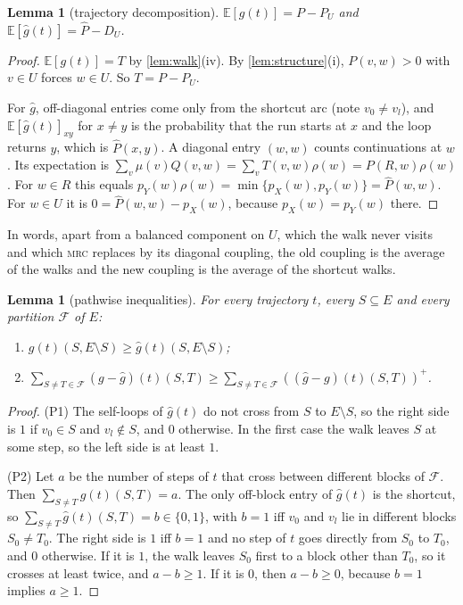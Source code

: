 \documentclass[11pt]{article}
\newtheorem{lemma}[theorem]{Lemma}
\theoremstyle{definition}
\newcommand{\pX}{p_X}
\newcommand{\pY}{p_Y}
\newcommand{\hP}{\hat P}
\newcommand{\pos}[1]{\left(#1\right)^{+}}
\newcommand{\MRC}{\textnormal{\textsc{mrc}}}
\newcommand{\F}{\mathcal{F}}
\newcommand{\Ex}{\mathbb{E}}
\begin{document}
\begin{lemma}[trajectory decomposition]\label{lem:traj}
$\Ex[g(t)]=P-P_U$ and $\Ex[\hat g(t)]=\hP-D_U$.
\end{lemma}
\begin{proof}
$\Ex[g(t)]=T$ by \cref{lem:walk}(iv). By \cref{lem:structure}(i), $P(v,w)>0$ with
$v\in U$ forces $w\in U$. So $T=P-P_U$.

For $\hat g$, off-diagonal entries come only from the shortcut arc (note
$v_0\neq v_l$), and $\Ex[\hat g(t)]_{xy}$ for $x\neq y$ is the probability that
the run starts at $x$ and the loop returns $y$, which is $\hP(x,y)$. A diagonal
entry $(w,w)$ counts continuations at $w$. Its expectation is
$\sum_v\mu(v)Q(v,w)=\sum_vT(v,w)\rho(w)=P(R,w)\rho(w)$. For $w\in R$ this equals
$\pY(w)\rho(w)=\min\{\pX(w),\pY(w)\}=\hP(w,w)$. For $w\in U$ it is
$0=\hP(w,w)-\pX(w)$, because $\pX(w)=\pY(w)$ there.
\end{proof}

In words, apart from a balanced component on $U$, which the walk never visits
and which \MRC{} replaces by its diagonal coupling, the old coupling is the
average of the walks and the new coupling is the average of the shortcut walks.

\begin{lemma}[pathwise inequalities]\label{lem:pathwise}
For every trajectory $t$, every $S\subseteq E$ and every partition $\F$ of $E$:
\begin{enumerate}[label=(P\arabic*)]
  \item $g(t)(S,E\setminus S)\ge\hat g(t)(S,E\setminus S)$;
  \item $\sum_{S\ne T\in\F}(g-\hat g)(t)(S,T)\ge\sum_{S\neq T\in\F}\pos{(\hat g-g)(t)(S,T)}$.
\end{enumerate}
\end{lemma}
\begin{proof}
(P1) The self-loops of $\hat g(t)$ do not cross from $S$ to $E\setminus S$, so
the right side is $1$ if $v_0\in S$ and $v_l\notin S$, and $0$ otherwise. In the
first case the walk leaves $S$ at some step, so the left side is at least $1$.

(P2) Let $a$ be the number of steps of $t$ that cross between different blocks
of $\F$. Then $\sum_{S\neq T}g(t)(S,T)=a$. The only off-block entry of
$\hat g(t)$ is the shortcut, so $\sum_{S\ne T}\hat g(t)(S,T)=b\in\{0,1\}$, with
$b=1$ iff $v_0$ and $v_l$ lie in different blocks $S_0\ne T_0$. The right side
is $1$ iff $b=1$ and no step of $t$ goes directly from $S_0$ to $T_0$, and $0$
otherwise. If it is $1$, the walk leaves $S_0$ first to a block other than
$T_0$, so it crosses at least twice, and $a-b\ge1$. If it is $0$, then
$a-b\ge0$, because $b=1$ implies $a\ge1$.
\end{proof}
\end{document}
